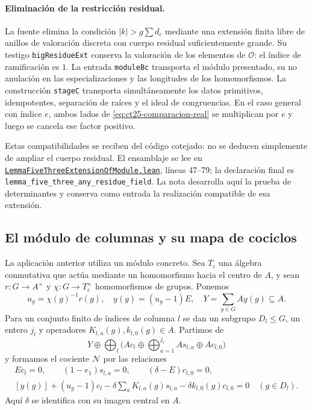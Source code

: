 \paragraph{Eliminación de la restricción residual.}
La fuente elimina la condición $|k|>g\sum d_c$ mediante una extensión finita libre de anillos de valoración discreta con cuerpo residual suficientemente grande. Su testigo \texttt{bigResidueExt} conserva la valoración de los elementos de $\mathcal O$: el índice de ramificación es $1$. La entrada \texttt{moduleBc} transporta el módulo presentado, su no anulación en las especializaciones y las longitudes de los homomorfismos. La construcción \texttt{stageC} transporta simultáneamente los datos primitivos, idempotentes, separación de raíces y el ideal de congruencias. En el caso general con índice $e$, ambos lados de \eqref{eq:ct25-comparacion-real} se multiplican por $e$ y luego se cancela ese factor positivo.

Estas compatibilidades se reciben del código cotejado: no se deducen simplemente de ampliar el cuerpo residual. El ensamblaje se lee en \href{https://github.com/CocoSgt/riemann-hypothesis-lean/blob/7cbf7a0c32fca1badf05931879a37c3f8a2b03b4/src/Formalism/WachLatticeTwists/RamifiedBlockRings/RamifiedBlockProofs/LemmaFiveThreeExtensionOfModule.lean}{\nolinkurl{LemmaFiveThreeExtensionOfModule.lean}}, líneas 47--79; la declaración final es \texttt{lemma\_five\_three\_any\_residue\_field}. La nota desarrolla aquí la prueba de determinantes y conserva como entrada la realización compatible de esa extensión.

\subsection{El módulo de columnas y su mapa de cociclos}

La aplicación anterior utiliza un módulo concreto. Sea $T_c$ una álgebra conmutativa que actúa mediante un homomorfismo hacia el centro de $A$, y sean $r:G\to A^\times$ y $\chi:G\to T_c^\times$ homomorfismos de grupos. Ponemos
\[
 u_g=\chi(g)^{-1}r(g),\quad y(g)=(u_g-1)E,\quad
 Y=\sum_{g\in G}Ay(g)\subseteq A.
\]
Para un conjunto finito de índices de columna $l$ se dan un subgrupo $D_l\le G$, un entero $j_l$ y operadores $K_{l,a}(g),k_{l,0}(g)\in A$. Partimos de
\[
 Y\oplus\bigoplus_l\bigl(Ac_l\oplus\textstyle\bigoplus_{a=1}^{j_l}As_{l,a}\oplus Ac_{l,0}\bigr)
\]
y formamos el cociente $\mathcal N$ por las relaciones
\begin{equation}
\begin{gathered}
 Ec_l=0,\qquad (1-e_1)s_{l,a}=0,\qquad
 (\delta-E)c_{l,0}=0,\\
 [y(g)]+(u_g-1)c_l
   -\delta\sum_aK_{l,a}(g)s_{l,a}
   -\delta k_{l,0}(g)c_{l,0}=0
       \quad(g\in D_l).
\end{gathered}
\label{eq:ct25-columnas}
\end{equation}
Aquí $\delta$ se identifica con su imagen central en $A$.


